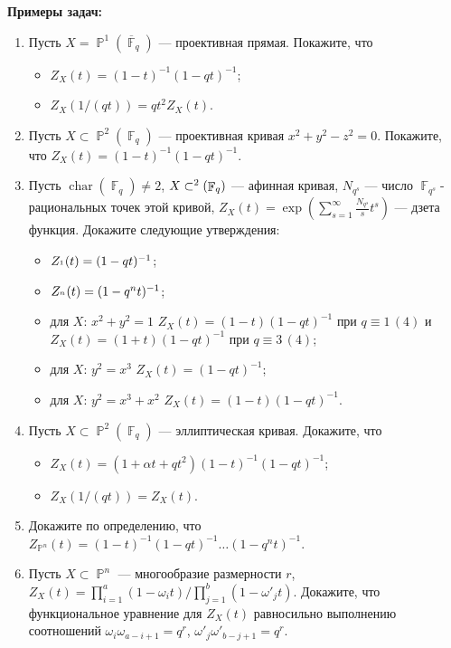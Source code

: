 \documentclass[a4paper, 12pt]{article}
\DeclareMathOperator{\PP}{\mathbb{P}}
\let\AA\relax
\DeclareMathOperator{\AA}{\mathbb{A}}
\DeclareMathOperator{\FF}{\mathbb{F}}
\DeclareMathOperator{\chr}{char}
\begin{document}
{\bf Примеры задач:}
\begin{enumerate}[noitemsep,topsep=0pt]
    \item Пусть $X=\PP^1(\overline{\FF}_q)$ --- проективная прямая. Покажите, что
    \begin{itemize}[noitemsep,topsep=0pt]
        \item $Z_X(t)=(1-t)^{-1}(1-qt)^{-1}$;
        \item $Z_X(1/(qt))=qt^2 Z_X(t)$.
    \end{itemize} %
    \item Пусть $X\subset\PP^2(\FF_q)$ --- проективная кривая $x^2+y^2-z^2=0$. Покажите, что $Z_X(t)=(1-t)^{-1}(1-qt)^{-1}$. %
    \item Пусть $\chr(\FF_q)\neq 2$, $X\subset\AA^2(\FF_q)$ --- афинная кривая, $N_{q^s}$ --- число $\FF_{q^s}$- рациональных точек этой кривой, $Z_X(t)=\exp\left(\sum_{s=1}^\infty \frac{N_{q^s}}{s} t^s\right)$ --- дзета функция. Докажите следующие утверждения:
    \begin{itemize}[noitemsep,topsep=0pt]
        \item $Z_{\AA^1}(t)=(1-qt)^{-1}$;
        \item $Z_{\AA^n}(t)=(1-q^nt)^{-1}$;
        \item для $X$: $x^2+y^2=1$ $Z_X(t)=(1-t)(1-qt)^{-1}$ при $q\equiv 1\, (4)$ и $Z_X(t)=(1+t)(1-qt)^{-1}$ при $q\equiv 3\, (4)$;
        \item для $X$: $y^2=x^3$ $Z_X(t)=(1-qt)^{-1}$;
        \item для $X$: $y^2=x^3+x^2$ $Z_X(t)=(1-t)(1-qt)^{-1}$.
    \end{itemize} %
    \item Пусть $X\subset\PP^2(\FF_q)$ --- эллиптическая кривая. Докажите, что 
    \begin{itemize}[noitemsep,topsep=0pt]
        \item $Z_X(t) = (1+\alpha t + qt^2)(1-t)^{-1}(1-qt)^{-1}$;
        \item $Z_X(1/(qt)) = Z_X(t)$.
    \end{itemize} %
    \item Докажите по определению, что $Z_{\PP^n}(t)=(1-t)^{-1} (1-qt)^{-1} \dots (1-q^n t)^{-1}$. %
    \item Пусть $X\subset \PP^n$ --- многообразие размерности $r$, $Z_X(t)=\prod_{i=1}^a (1-\omega_i t) / \prod_{j=1}^b (1-\omega'_j t)$. Докажите, что функциональное уравнение для $Z_X(t)$ равносильно выполнению соотношений $\omega_i \omega_{a-i+1}=q^r$, $\omega'_j \omega'_{b-j+1}=q^r$. %

\end{enumerate}
\end{document}
